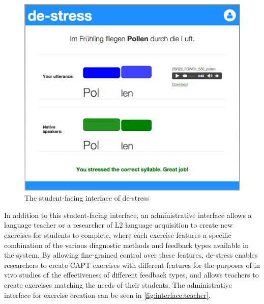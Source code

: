 	\begin{figure}[htb]
		\centering
		\includegraphics[width=\textwidth]{img/screenshots/StudentInterface-userIcon}
		\caption{The student-facing interface of de-stress}
		\label{fig:interface:student}
	\end{figure}

In addition to this student-facing interface, 
an administrative interface allows
a language teacher or a researcher of L2 language acquisition 
to
create new exercises for students to complete, where each exercise features a specific combination of the various diagnostic methods and feedback types available in the system. By allowing fine-grained control over these features, de-stress enables researchers to create CAPT exercises with different features for the purposes of in vivo studies of the effectiveness of different feedback types, and allows teachers to create exercises matching the needs of their students. The 
administrative interface for exercise creation can be seen in \cref{fig:interface:teacher}.

